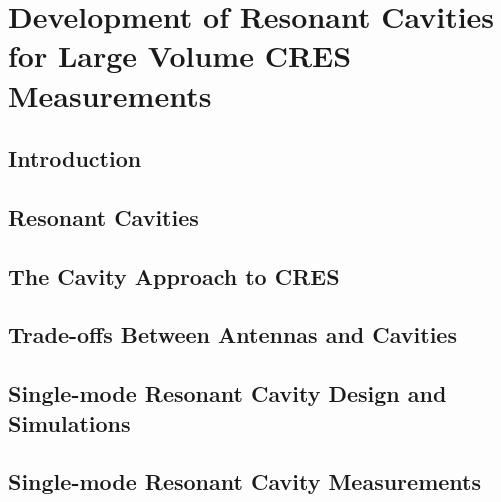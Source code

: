 
\chapter{Development of Resonant Cavities for Large Volume CRES Measurements}

\section{Introduction}

\section{Resonant Cavities}

\section{The Cavity Approach to CRES}

\section{Trade-offs Between Antennas and Cavities}

\section{Single-mode Resonant Cavity Design and Simulations}

\section{Single-mode Resonant Cavity Measurements}

